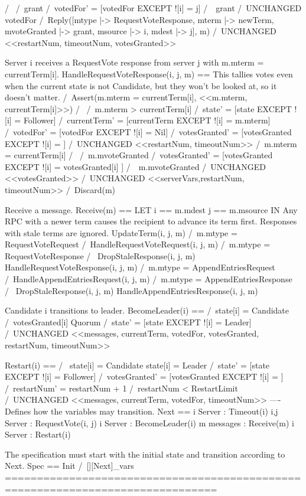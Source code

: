        /\ \/ /\ grant  
             /\ votedFor' = [votedFor EXCEPT ![i] = j]
          \/ /\ ~grant 
             /\ UNCHANGED votedFor
       /\ Reply([mtype        |-> RequestVoteResponse,
                 mterm        |-> newTerm,
                 mvoteGranted |-> grant,
                 msource      |-> i,
                 mdest        |-> j],
                 m)    
       /\ UNCHANGED <<restartNum, timeoutNum, votesGranted>>

\* Server i receives a RequestVote response from server j with
\* m.mterm = currentTerm[i].
HandleRequestVoteResponse(i, j, m) ==
    \* This tallies votes even when the current state is not Candidate, but
    \* they won't be looked at, so it doesn't matter. 
    \* /\ Assert(m.mterm = currentTerm[i], <<m.mterm, currentTerm[i]>>)
    /\ \/ /\ m.mterm > currentTerm[i]
          /\ state'        = [state EXCEPT ![i] = Follower]
          /\ currentTerm'  = [currentTerm EXCEPT ![i] = m.mterm]
          /\ votedFor'     = [votedFor EXCEPT ![i] = Nil]
          /\ votesGranted' = [votesGranted EXCEPT ![i] = {}]
          /\ UNCHANGED <<restartNum, timeoutNum>>
       \/ /\ m.mterm = currentTerm[i]
          /\ \/ /\ m.mvoteGranted
                /\ votesGranted' = [votesGranted EXCEPT ![i] =
                                    votesGranted[i] ]
             \/ /\ ~m.mvoteGranted
                /\ UNCHANGED <<votesGranted>>
          /\ UNCHANGED <<serverVars,restartNum, timeoutNum>>
    /\ Discard(m)

\* Receive a message.
Receive(m) ==
    LET i == m.mdest
        j == m.msource
    IN \* Any RPC with a newer term causes the recipient to advance
       \* its term first. Responses with stale terms are ignored.
       \/ UpdateTerm(i, j, m)
       \/ /\ m.mtype = RequestVoteRequest
          /\ HandleRequestVoteRequest(i, j, m)
       \/ /\ m.mtype = RequestVoteResponse
          /\ \/ DropStaleResponse(i, j, m)
             \/ HandleRequestVoteResponse(i, j, m)
       \/ /\ m.mtype = AppendEntriesRequest
          /\ HandleAppendEntriesRequest(i, j, m)
       \/ /\ m.mtype = AppendEntriesResponse
          /\ \/ DropStaleResponse(i, j, m)
             \/ HandleAppendEntriesResponse(i, j, m)

\* Candidate i transitions to leader.
BecomeLeader(i) ==
    /\ state[i] = Candidate
    /\ votesGranted[i] \in Quorum
    /\ state'      = [state EXCEPT ![i] = Leader]
    /\ UNCHANGED <<messages, currentTerm, votedFor, votesGranted, restartNum, timeoutNum>>

Restart(i) == 
    /\ \/ state[i] = Candidate
       \/ state[i] = Leader 
    /\ state'        = [state EXCEPT ![i] = Follower]
    /\ votesGranted' = [votesGranted EXCEPT ![i] = {}]
    /\ restartNum'   = restartNum + 1
    /\ restartNum    < RestartLimit
    /\ UNCHANGED <<messages, currentTerm, votedFor, timeoutNum>>
----
\* Defines how the variables may transition.
Next ==\/ \E i \in Server : Timeout(i)
       \/ \E i,j \in Server : RequestVote(i, j)  
       \/ \E i \in Server : BecomeLeader(i)
       \/ \E m \in messages : Receive(m)
       \/ \E i \in Server : Restart(i)

\* The specification must start with the initial state and transition according
\* to Next.
Spec == Init /\ [][Next]_vars
===============================================================================